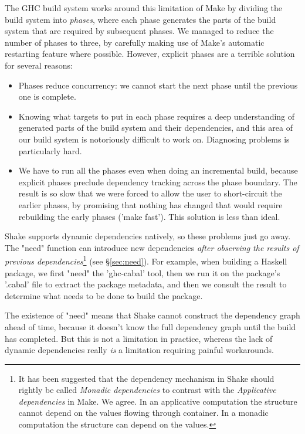 The GHC build system works around this limitation of Make by
dividing the build system into \emph{phases}, where each phase
generates the parts of the build system that are required by
subsequent phases. We managed to reduce the number of phases to
three, by carefully making use of Make's automatic restarting
feature where possible. However, explicit phases are a terrible
solution for several reasons:

\begin{itemize}
\item Phases reduce concurrency: we cannot start the next phase until
  the previous one is complete.
\item Knowing what targets to put in each phase requires a deep
  understanding of generated parts of the build system and their dependencies,
  and this area of our build system is notoriously difficult to work on.
  Diagnosing problems is particularly hard.
\item We have to run all the phases even when doing an incremental build,
 because explicit phases preclude dependency tracking across the phase boundary.
 The result is so slow that we were forced to allow the user to short-circuit
 the earlier phases, by promising that nothing has changed that would require
 rebuilding the early phases (\lst'make fast').  This solution is less than
 ideal.
\end{itemize}

Shake supports dynamic dependencies natively, so these problems just
go away.  The \lst"need" function can introduce new dependencies
\emph{after observing the results of previous dependencies}\footnote{It has been
suggested that the dependency mechanism in Shake should rightly be called
\emph{Monadic dependencies} to contrast with the \emph{Applicative dependencies}
in Make. We agree. In an applicative computation the structure cannot depend on
the values flowing through container. In a monadic computation the structure can
depend on the values.}
(see \S\ref{sec:need}). For example, when building a Haskell package, we first
\lst"need" the \lst'ghc-cabal' tool, then we run it on the package's \lst'.cabal' file to
extract the package metadata, and then we consult the result to determine what
needs to be done to build the package.

The existence of \lst"need" means that Shake cannot construct the
dependency graph ahead of time, because it doesn't know the full
dependency graph until the build has completed.  But this is not a
limitation in practice, whereas the lack of dynamic dependencies really
\emph{is} a limitation requiring painful workarounds.

